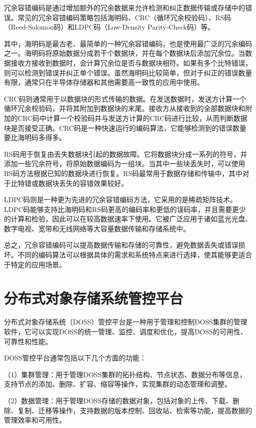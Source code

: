 冗余容错编码是通过增加额外的冗余数据来允许检测和纠正数据传输或存储中的错误。常见的冗余容错编码策略包括海明码、CRC（循环冗余校验码）、RS码（Reed-Solomon码）和LDPC码（Low-Density Parity-Check码）等。

其中，海明码是最古老、最简单的一种冗余容错编码，也是使用最广泛的冗余编码之一。海明码将原始数据分成若干个数据块，并在每个数据块后添加冗余位。当数据接收方接收到数据时，会计算冗余位是否与数据块相符。如果有多个比特错误，则可以检测到错误并纠正单个错误。虽然海明码比较简单，但对于纠正的错误数量有限，通常只在半导体存储器和其他需要高一致性的应用中使用。

CRC码则通常用于以数据块的形式传输的数据。在发送数据时，发送方计算一个循环冗余校验码，并将其附加到数据块的末尾。接收方从接收到的全部数据块和附加的CRC码中计算一个校验码并与发送方计算的CRC码进行比较，从而判断数据块是否接受正确。CRC码是一种快速运行的编码算法，它能够检测到的错误数量要比海明码多得多。

RS码用于恢复由丢失数据块引起的数据故障。它将数据块分成一系列的符号，并添加一些冗余符号，将原始数据编码为一组块。当其中一些块丢失时，可以使用RS码方法根据已知的数据块进行恢复。RS码最常用于数据存储和传输中，其中对于比特错或数据块丢失的容错效果较好。

LDPC码则是一种更为先进的冗余容错编码方法，它采用的是稀疏矩阵技术。LDPC码能够支持比海明码和RS码更高的编码率和更低的误码率，并且需要更少的计算和检验，因此可以在较高数据速率下使用。它被广泛应用于诸如蓝光光盘、数字电视、宽带和无线网络等大容量数据传输和存储系统中。

总之，冗余容错编码可以提高数据传输和存储的可靠性，避免数据丢失或错误损坏。不同的编码算法可以根据具体的需求和系统特点来进行选择，使其能够更适合于特定的应用场景。



\section{分布式对象存储系统管控平台}

分布式对象存储系统（DOSS）管控平台是一种用于管理和控制DOSS集群的管理软件，它可以实现DOSS的统一管理、监控、调度和优化，提高DOSS的可用性、可靠性和性能\cite{kongqineji}。

DOSS管控平台通常包括以下几个方面的功能：

（1）集群管理：用于管理DOSS集群的拓扑结构、节点状态、数据分布等信息，支持节点的添加、删除、扩容、缩容等操作，实现集群的动态管理和调整。

（2）数据管理：用于管理DOSS存储的数据对象，包括对象的上传、下载、删除、复制、迁移等操作，支持数据的版本控制、回收站、检索等功能，提高数据的管理效率和可用性。

